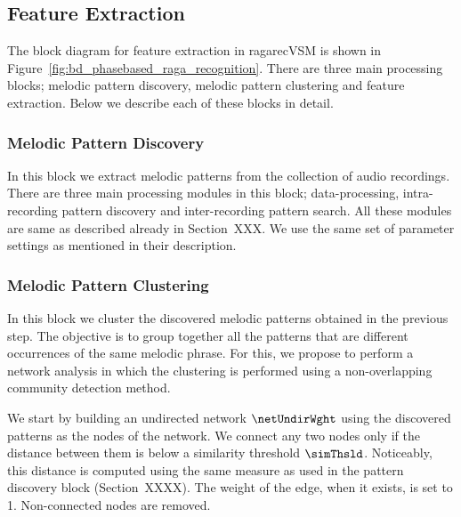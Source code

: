 \subsection{Feature Extraction}
\label{sec:vsm_feature_extraction}

The block diagram for feature extraction in \acrshort{ragarecVSM} is shown in Figure~\ref{fig:bd_phasebased_raga_recognition}. There are three main processing blocks; melodic pattern discovery, melodic pattern clustering and feature extraction. Below we describe each of these blocks in detail. 

\subsubsection{Melodic Pattern Discovery}
\label{sec:vsm_feature_extraction_pattern_discovery}
In this block we extract melodic patterns from the collection of audio recordings. There are three main processing modules in this block; data-processing, intra-recording pattern discovery and inter-recording pattern search. All these modules are same as described already in Section~XXX. We use the same set of parameter settings as mentioned in their description.

\subsubsection{Melodic Pattern Clustering}
\label{sec:vsm_feature_extraction_pattern_clustering}

In this block we cluster the discovered melodic patterns obtained in the previous step. The objective is to group together all the patterns that are different occurrences of the same melodic phrase. For this, we propose to perform a network analysis in which the clustering is performed using a non-overlapping community detection method. 

We start by building an undirected network $\netUndirWght$ using the discovered patterns as the nodes of the network. We connect any two nodes only if the distance between them is below a similarity threshold $\simThsld$. Noticeably, this distance is computed using the same measure as used in the pattern discovery block (Section~XXXX). The weight of the edge, when it exists, is set to 1. Non-connected nodes are removed.

